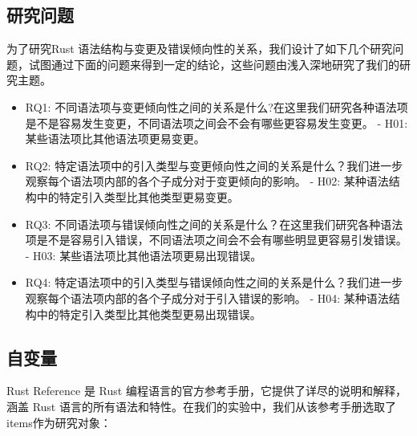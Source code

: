 \subsection{研究问题}
为了研究Rust 语法结构与变更及错误倾向性的关系，我们设计了如下几个研究问题，试图通过下面的问题来得到一定的结论，这些问题由浅入深地研究了我们的研究主题。
\begin{itemize}
    \item RQ1: 不同语法项与变更倾向性之间的关系是什么?在这里我们研究各种语法项是不是容易发生变更，不同语法项之间会不会有哪些更容易发生变更。
    - H01: 某些语法项比其他语法项更易变更。
    \item RQ2: 特定语法项中的引入类型与变更倾向性之间的关系是什么？我们进一步观察每个语法项内部的各个子成分对于变更倾向的影响。
    - H02: 某种语法结构中的特定引入类型比其他类型更易变更。
    \item RQ3: 不同语法项与错误倾向性之间的关系是什么？在这里我们研究各种语法项是不是容易引入错误，不同语法项之间会不会有哪些明显更容易引发错误。
    - H03: 某些语法项比其他语法项更易出现错误。
    \item RQ4: 特定语法项中的引入类型与错误倾向性之间的关系是什么？我们进一步观察每个语法项内部的各个子成分对于引入错误的影响。
      - H04: 某种语法结构中的特定引入类型比其他类型更易出现错误。
\end{itemize}

\subsection{自变量}
Rust Reference 是 Rust 编程语言的官方参考手册，它提供了详尽的说明和解释，涵盖 Rust 语言的所有语法和特性。在我们的实验中，我们从该参考手册选取了items作为研究对象：

